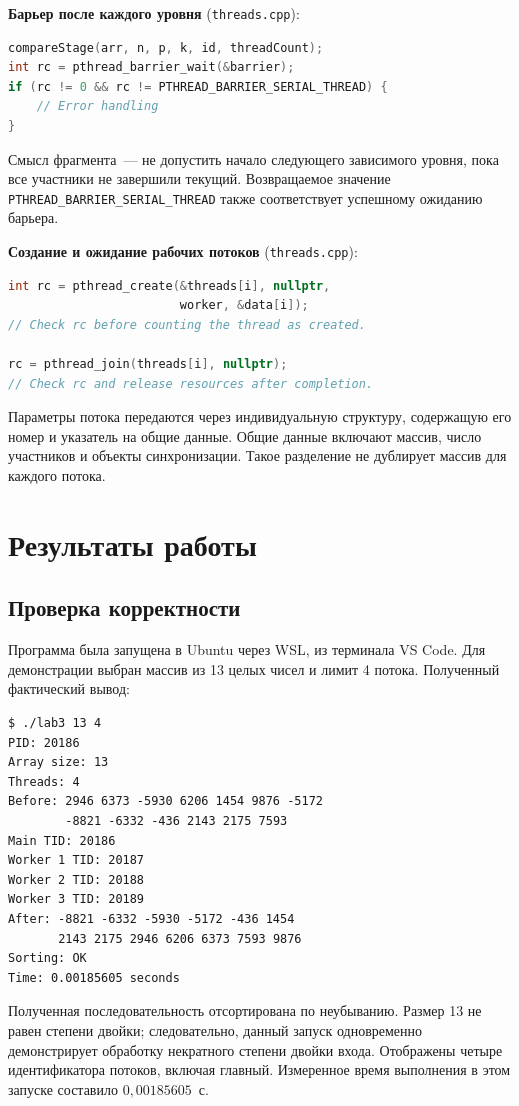 \documentclass[12pt,a4paper,oneside]{article}
\begin{document}
\textbf{Барьер после каждого уровня} (\texttt{threads.cpp}):
\begin{lstlisting}[language=C++]
compareStage(arr, n, p, k, id, threadCount);
int rc = pthread_barrier_wait(&barrier);
if (rc != 0 && rc != PTHREAD_BARRIER_SERIAL_THREAD) {
    // Error handling
}
\end{lstlisting}
Смысл фрагмента~--- не допустить начало следующего зависимого уровня, пока все участники не завершили текущий. Возвращаемое значение \texttt{PTHREAD\_BARRIER\_SERIAL\_THREAD} также соответствует успешному ожиданию барьера.

\textbf{Создание и ожидание рабочих потоков} (\texttt{threads.cpp}):
\begin{lstlisting}[language=C++]
int rc = pthread_create(&threads[i], nullptr,
                        worker, &data[i]);
// Check rc before counting the thread as created.

rc = pthread_join(threads[i], nullptr);
// Check rc and release resources after completion.
\end{lstlisting}
Параметры потока передаются через индивидуальную структуру, содержащую его номер и указатель на общие данные. Общие данные включают массив, число участников и объекты синхронизации. Такое разделение не дублирует массив для каждого потока.

\section{Результаты работы}
\subsection{Проверка корректности}
Программа была запущена в Ubuntu через WSL, из терминала VS Code. Для демонстрации выбран массив из 13 целых чисел и лимит 4 потока. Полученный фактический вывод:
\begin{lstlisting}[basicstyle=\scriptsize\ttfamily]
$ ./lab3 13 4
PID: 20186
Array size: 13
Threads: 4
Before: 2946 6373 -5930 6206 1454 9876 -5172
        -8821 -6332 -436 2143 2175 7593
Main TID: 20186
Worker 1 TID: 20187
Worker 2 TID: 20188
Worker 3 TID: 20189
After: -8821 -6332 -5930 -5172 -436 1454
       2143 2175 2946 6206 6373 7593 9876
Sorting: OK
Time: 0.00185605 seconds
\end{lstlisting}
Полученная последовательность отсортирована по неубыванию. Размер 13 не равен степени двойки; следовательно, данный запуск одновременно демонстрирует обработку некратного степени двойки входа. Отображены четыре идентификатора потоков, включая главный. Измеренное время выполнения в этом запуске составило $0{,}00185605$~с.
\end{document}
